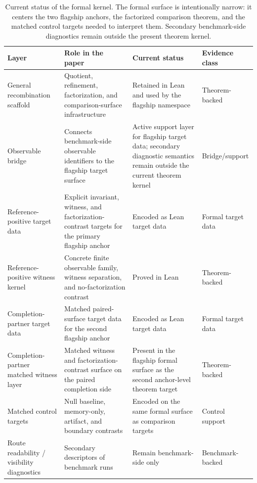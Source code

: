 \documentclass[11pt]{article}
\theoremstyle{definition}
\begin{document}
\begin{table}[t]
\centering
\small
\caption{Current status of the formal kernel. The formal surface is intentionally narrow: it centers the two flagship anchors, the factorized comparison theorem, and the matched control targets needed to interpret them. Secondary benchmark-side diagnostics remain outside the present theorem kernel.}
\label{tab:formal-kernel-status}
\begin{tabular}{p{3.0cm}p{4.0cm}p{3.8cm}p{2.4cm}}
\toprule
Layer & Role in the paper & Current status & Evidence class \\
\midrule
General recombination scaffold &
Quotient, refinement, factorization, and comparison-surface infrastructure &
Retained in Lean and used by the flagship namespace &
Theorem-backed \\
\addlinespace
Observable bridge &
Connects benchmark-side observable identifiers to the flagship target surface &
Active support layer for flagship target data; secondary diagnostic semantics remain outside the current theorem kernel &
Bridge/support \\
\addlinespace
Reference-positive target data &
Explicit invariant, witness, and factorization-contrast targets for the primary flagship anchor &
Encoded as Lean target data &
Formal target data \\
\addlinespace
Reference-positive witness kernel &
Concrete finite observable family, witness separation, and no-factorization contrast &
Proved in Lean &
Theorem-backed \\
\addlinespace
Completion-partner target data &
Matched paired-surface target data for the second flagship anchor &
Encoded as Lean target data &
Formal target data \\
\addlinespace
Completion-partner matched witness layer &
Matched witness and factorization-contrast surface on the paired completion side &
Present in the flagship formal surface as the second anchor-level theorem target &
Theorem-backed \\
\addlinespace
Matched control targets &
Null baseline, memory-only, artifact, and boundary contrasts &
Encoded on the same formal surface as comparison targets &
Control support \\
\addlinespace
Route readability / visibility diagnostics &
Secondary descriptors of benchmark runs &
Remain benchmark-side only &
Benchmark-backed \\
\bottomrule
\end{tabular}
\end{table}
 
\end{document}
